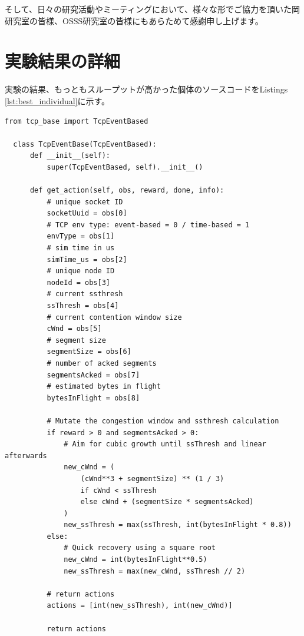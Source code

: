 \documentclass[a4paper,11pt]{jreport}
\begin{document}
そして、日々の研究活動やミーティングにおいて、様々な形でご協力を頂いた岡研究室の皆様、OSSS研究室の皆様にもあらためて感謝申し上げます。

\newpage

\renewcommand{\bibname}{参考文献}




\appendix
\chapter{実験結果の詳細}
\label{appendix:experiment-result}
実験の結果、もっともスループットが高かった個体のソースコードをListings \ref{lst:best_individual}に示す。
\begin{lstlisting}[caption=最もスループットが高かった個体のソースコード,label=lst:best_individual]
  from tcp_base import TcpEventBased

  class TcpEventBase(TcpEventBased):
      def __init__(self):
          super(TcpEventBased, self).__init__()

      def get_action(self, obs, reward, done, info):
          # unique socket ID
          socketUuid = obs[0]
          # TCP env type: event-based = 0 / time-based = 1
          envType = obs[1]
          # sim time in us
          simTime_us = obs[2]
          # unique node ID
          nodeId = obs[3]
          # current ssthresh
          ssThresh = obs[4]
          # current contention window size
          cWnd = obs[5]
          # segment size
          segmentSize = obs[6]
          # number of acked segments
          segmentsAcked = obs[7]
          # estimated bytes in flight
          bytesInFlight = obs[8]

          # Mutate the congestion window and ssthresh calculation
          if reward > 0 and segmentsAcked > 0:
              # Aim for cubic growth until ssThresh and linear afterwards
              new_cWnd = (
                  (cWnd**3 + segmentSize) ** (1 / 3)
                  if cWnd < ssThresh
                  else cWnd + (segmentSize * segmentsAcked)
              )
              new_ssThresh = max(ssThresh, int(bytesInFlight * 0.8))
          else:
              # Quick recovery using a square root
              new_cWnd = int(bytesInFlight**0.5)
              new_ssThresh = max(new_cWnd, ssThresh // 2)

          # return actions
          actions = [int(new_ssThresh), int(new_cWnd)]

          return actions
  \end{lstlisting}
\end{document}
